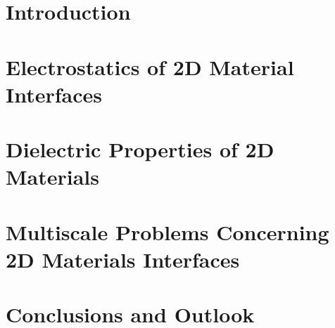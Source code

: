 \documentclass[%
    twoside, openright, titlepage, numbers=noenddot,%
    cleardoublepage=empty,%
    abstractoff,%
    BCOR=5.5mm, paper=a4, fontsize=12pt,%
    ]{scrbook}
\begin{document}
\frenchspacing
\raggedbottom%

%
%
%
% 

%
%




\cleardoublepage
\cleardoublepage
\cleardoublepage
\pagestyle{scrheadings}
\cleardoublepage

%
%

\part{Introduction}
\label{part:introduction}
\newcommand*\imgdir{}
\cleardoublepage{}%



\cleardoublepage%

\part{Electrostatics of 2D Material Interfaces}
\label{part:electr-2d-mater}

\cleardoublepage%

\cleardoublepage

\part{Dielectric Properties of 2D Materials }
\label{part:diel-prop-2d}

\cleardoublepage
\cleardoublepage


\part{Multiscale Problems Concerning 2D Materials Interfaces}
\label{part:mult-probl-conc}

\cleardoublepage
\cleardoublepage
\cleardoublepage


\part{Conclusions and Outlook}
\label{part:conclusions}

\cleardoublepage

\cleardoublepage


\cleardoublepage

\cleardoublepage
\cleardoublepage
\end{document}
